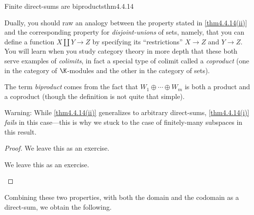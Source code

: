 \begin{thm}{Finite direct-sums are biproducts}{thm4.4.14}
\begin{rmk}
		Dually, you should raw an analogy between the property stated in \cref{thm4.4.14(ii)} and the corresponding property for \emph{disjoint-unions} of sets, namely, that you can define a function $X\coprod Y\rightarrow Z$ by specifying its ``restrictions'' $X\rightarrow Z$ and $Y\rightarrow Z$.  You will learn when you study category theory in more depth that these both serve examples of \emph{colimits}, in fact a special type of colimit called a \emph{coproduct} (one in the category of $\K$-modules and the other in the category of sets).
	\end{rmk}
	\begin{rmk}
		The term \emph{biproduct} comes from the fact that $W_1\oplus \cdots \oplus W_m$ is both a product and a coproduct (though the definition is not quite that simple).
	\end{rmk}
	\begin{rmk}
		Warning:  While \cref{thm4.4.14(ii)} generalizes to arbitrary direct-sums, \cref{thm4.4.14(i)} \emph{fails} in this case---this is why we stuck to the case of finitely-many subspaces in this result.
	\end{rmk}
	\begin{proof}
		We leave this as an exercise.
		\begin{exr}[breakable=false]{}{}
			We leave this as an exercise.
		\end{exr}
	\end{proof}
\end{thm}
Combining these two properties, with both the domain and the codomain as a direct-sum, we obtain the following.
